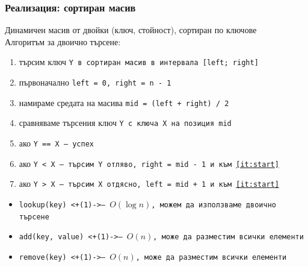 \documentclass[alsotrans]{beamerswitch}
\begin{document}
\begin{frame}
  \frametitle{Реализация: сортиран масив}
  Динамичен масив от двойки (ключ, стойност), сортиран по ключове\\
  \pause
  Алгоритъм за двоично търсене:
  \begin{enumerate}
  \item търсим ключ \tt Y в сортиран масив в интервала \tt{[left; right]}
  \item първоначално \tt{left = 0}, \tt{right = n - 1}
  \item\label{it:start}  намираме средата на масива \tt{mid = (left + right) / 2}
  \item сравняваме търсения ключ \tt Y с ключа \tt X на позиция mid
  \item ако \tt{Y == X} --- успех
  \item ако \tt{Y < X} --- търсим \tt Y отляво, \tt{right = mid - 1} и към \ref{it:start}
  \item ако \tt{Y > X} --- търсим \tt X отдясно, \tt{left = mid + 1} и към \ref{it:start}
  \end{enumerate}
  \pause
  \begin{itemize}
  \item \tt{lookup(key)} \onslide<+(1)->{--- $O(\log n)$, можем да използваме двоично търсене}
  \item \tt{add(key, value)} \onslide<+(1)->{--- $O(n)$, може да разместим всички елементи}
  \item \tt{remove(key)} \onslide<+(1)->{--- $O(n)$, може да разместим всички елементи}
  \end{itemize}
\end{frame}
\end{document}
